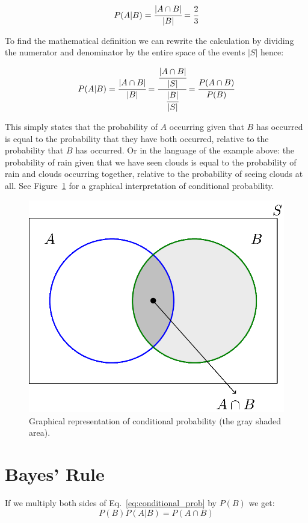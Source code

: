 \begin{equation}
P(A|B) = \cfrac{|A\cap B|}{|B|} = \cfrac{2}{3}
\end{equation}

To find the mathematical definition we can rewrite the calculation by dividing the numerator and denominator by the entire space of the events $|S|$ hence:

\begin{equation}
  P(A|B) = \cfrac{|A\cap B|}{|B|} = \cfrac{\cfrac{|A\cap B|}{|S|}}{\cfrac{|B|}{|S|}} = \cfrac{P(A\cap B)}{P(B)}
  \label{eq:conditional_prob}
\end{equation}

This simply states that the probability of $A$ occurring given that $B$ has occurred is equal to the probability that they have both occurred, relative to the probability that $B$ has occurred.
Or in the language of the example above: the probability of rain given that we have seen clouds is equal to the probability of rain and clouds occurring together, relative to the probability of seeing clouds at all.
See Figure~\ref{fig:conditional_prob} for a graphical interpretation of conditional probability.

\begin{figure}[tb]
  \centering
  \includegraphics[width=0.5\linewidth]{figures/conditional_b}
  \caption{Graphical representation of conditional probability (the gray shaded area).}
  \label{fig:conditional_prob}
\end{figure}

\section{Bayes' Rule}

If we multiply both sides of Eq.~\ref{eq:conditional_prob} by $P(B)$ we get:
\begin{equation}
P(B)P(A|B)=P(A\cap B)
\end{equation}

